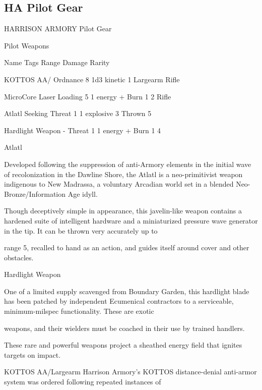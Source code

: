 \subsection{HA Pilot Gear}

                                  HARRISON ARMORY Pilot Gear

                                                    Pilot Weapons

  Name                    Tags                                      Range            Damage                  Rarity

 KOTTOS AA/               Ordnance                                  8                1d3 kinetic             1
 Largearm Rifle

 MicroCore Laser          Loading                                  5                 1 energy + Burn 1       2
 Rifle

 Atlatl                   Seeking                                  Threat 1
         1 explosive             3
                                                                   Thrown 5

 Hardlight Weapon         -                                        Threat 1          1 energy + Burn 1       4

Atlatl

Developed following the suppression of anti-Armory elements in the initial wave of recolonization in the
Dawline Shore, the Atlatl is a neo-primitivist weapon indigenous to New Madrassa, a voluntary Arcadian
world set in a blended Neo-Bronze/Information Age idyll.

Though deceptively simple in appearance, this javelin-like weapon contains a hardened suite of intelligent
hardware and a miniaturized pressure wave generator in the tip. It can be thrown very accurately up to

range 5, recalled to hand as an action, and guides itself around cover and other obstacles.


Hardlight Weapon

One of a limited supply scavenged from Boundary Garden, this hardlight blade has been patched by
independent Ecumenical contractors to a serviceable, minimum-milspec functionality. These are exotic

weapons, and their wielders must be coached in their use by trained handlers.

These rare and powerful weapons project a sheathed energy field that ignites targets on impact.


KOTTOS AA/Largearm
Harrison Armory’s KOTTOS distance-denial anti-armor system was ordered following repeated instances of

